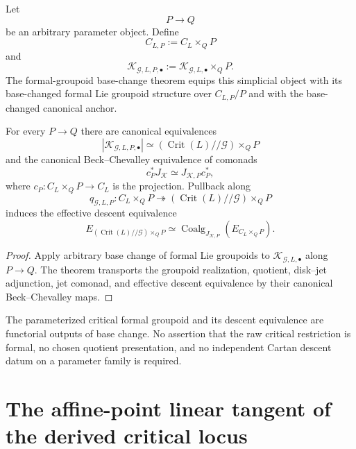 \begin{construction}
\label{constr:symmetry-noether-parameterized-critical-formal-groupoid}
Let
\[
P\longrightarrow Q
\]
be an arbitrary parameter object.  Define
\[
C_{L,P}:=C_L\times_QP
\]
and
\[
\boxed{
\mathcal K_{\mathcal G,L,P,\bullet}
:=
\mathcal K_{\mathcal G,L,\bullet}\times_QP.
}
\]
The formal-groupoid base-change theorem equips this simplicial object with its
base-changed formal Lie groupoid structure over $C_{L,P}/P$ and with the
base-changed canonical anchor.
\end{construction}

\begin{theorem}
\label{thm:symmetry-noether-parameterized-quotient-and-jet-calculus}
For every $P\to Q$ there are canonical equivalences
\[
\left|
\mathcal K_{\mathcal G,L,P,\bullet}
\right|
\simeq
\left(
\operatorname{Crit}(L)//\mathcal G
\right)\times_QP
\]
and the canonical Beck--Chevalley equivalence of comonads
\[
c_P^*J_{\mathcal K}
\simeq
J_{\mathcal K,P}c_P^*,
\]
where $c_P:C_L\times_QP\to C_L$ is the projection.  Pullback along
\[
q_{\mathcal G,L,P}:
C_L\times_QP
\twoheadrightarrow
\left(
\operatorname{Crit}(L)//\mathcal G
\right)\times_QP
\]
induces the effective descent equivalence
\[
E_{
(\operatorname{Crit}(L)//\mathcal G)\times_QP
}
\simeq
\operatorname{Coalg}_{J_{\mathcal K,P}}
\left(
E_{C_L\times_QP}
\right).
\]
\end{theorem}

\begin{proof}
Apply arbitrary base change of formal Lie groupoids to
$\mathcal K_{\mathcal G,L,\bullet}$ along $P\to Q$.  The theorem transports the
groupoid realization, quotient, disk--jet adjunction, jet comonad, and effective
descent equivalence by their canonical Beck--Chevalley maps.
\end{proof}

\begin{proposition}
\label{prop:symmetry-noether-no-critical-formality-or-parameterized-descent-datum}
The parameterized critical formal groupoid and its descent equivalence are
functorial outputs of base change.  No assertion that the raw critical restriction
is formal, no chosen quotient presentation, and no independent Cartan descent
datum on a parameter family is required.
\end{proposition}

\section{The affine-point linear tangent of the derived critical locus}
\label{sec:symmetry-noether-the-affine-point-linear-tangent-of-the-derived-critical-locus}

